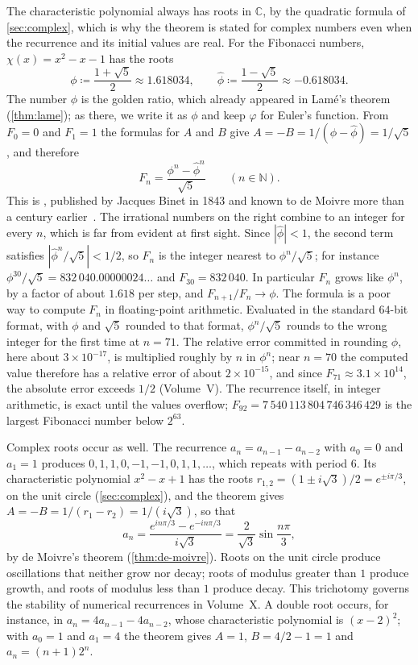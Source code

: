 The characteristic polynomial always has roots in $\mathbb C$, by the quadratic formula of \cref{sec:complex}, which is why the theorem is stated for complex numbers even when the recurrence and its initial values are real. For the Fibonacci numbers, $\chi(x)=x^2-x-1$ has the roots
\[
\phi\coloneqq\frac{1+\sqrt5}{2}\approx1.618034,\qquad\hat\phi\coloneqq\frac{1-\sqrt5}{2}\approx-0.618034 .
\]
The number $\phi$ is the golden ratio, which already appeared in Lam\'e's theorem (\cref{thm:lame}); as there, we write it as $\phi$ and keep $\varphi$ for Euler's function. From $F_0=0$ and $F_1=1$ the formulas for $A$ and $B$ give $A=-B=1/(\phi-\hat\phi)=1/\sqrt5$, and therefore
\begin{equation}
F_n=\frac{\phi^n-\hat\phi^n}{\sqrt5}\qquad(n\in\mathbb N).
\label{eq:binet}
\end{equation}
This is , published by Jacques Binet in 1843 and known to de Moivre more than a century earlier~\cite[Sect.~1.2.8]{knuth1997taocp1}. The irrational numbers on the right combine to an integer for every $n$, which is far from evident at first sight. Since $|\hat\phi|<1$, the second term satisfies $|\hat\phi^n/\sqrt5|<1/2$, so $F_n$ is the integer nearest to $\phi^n/\sqrt5$; for instance $\phi^{30}/\sqrt5=832\,040.00000024\ldots$ and $F_{30}=832\,040$. In particular $F_n$ grows like $\phi^n$, by a factor of about $1.618$ per step, and $F_{n+1}/F_n\to\phi$. The formula is a poor way to compute $F_n$ in floating-point arithmetic. Evaluated in the standard $64$-bit format, with $\phi$ and $\sqrt5$ rounded to that format, $\phi^n/\sqrt5$ rounds to the wrong integer for the first time at $n=71$. The relative error committed in rounding $\phi$, here about $3\times10^{-17}$, is multiplied roughly by $n$ in $\phi^n$; near $n=70$ the computed value therefore has a relative error of about $2\times10^{-15}$, and since $F_{71}\approx3.1\times10^{14}$, the absolute error exceeds $1/2$ (Volume~V). The recurrence itself, in integer arithmetic, is exact until the values overflow; $F_{92}=7\,540\,113\,804\,746\,346\,429$ is the largest Fibonacci number below $2^{63}$.

Complex roots occur as well. The recurrence $a_n=a_{n-1}-a_{n-2}$ with $a_0=0$ and $a_1=1$ produces $0,1,1,0,-1,-1,0,1,1,\ldots$, which repeats with period $6$. Its characteristic polynomial $x^2-x+1$ has the roots $r_{1,2}=(1\pm i\sqrt3)/2=e^{\pm i\pi/3}$, on the unit circle (\cref{sec:complex}), and the theorem gives $A=-B=1/(r_1-r_2)=1/(i\sqrt3)$, so that
\[
a_n=\frac{e^{in\pi/3}-e^{-in\pi/3}}{i\sqrt3}=\frac{2}{\sqrt3}\sin\frac{n\pi}{3},
\]
by de Moivre's theorem (\cref{thm:de-moivre}). Roots on the unit circle produce oscillations that neither grow nor decay; roots of modulus greater than $1$ produce growth, and roots of modulus less than $1$ produce decay. This trichotomy governs the stability of numerical recurrences in Volume~X. A double root occurs, for instance, in $a_n=4a_{n-1}-4a_{n-2}$, whose characteristic polynomial is $(x-2)^2$; with $a_0=1$ and $a_1=4$ the theorem gives $A=1$, $B=4/2-1=1$ and $a_n=(n+1)2^n$.

